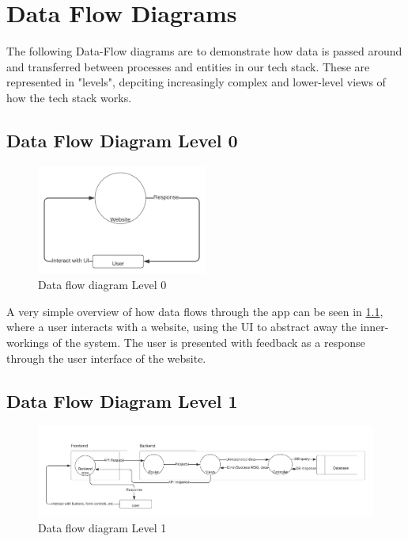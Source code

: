\documentclass[a4paper,11pt]{report}
\begin{document}
\chapter{Data Flow Diagrams}
The following Data-Flow diagrams are to demonstrate how data is passed around
and transferred between processes and entities in our tech stack. These are
represented in "levels", depciting increasingly complex and lower-level views of
how the tech stack works.

\section{Data Flow Diagram Level 0}
\begin{figure}[h]
    \centering
    \includegraphics[width=0.5\textwidth,keepaspectratio]{d2-dfd-0.png}
    \caption{Data flow diagram Level 0}
    \label{fig:dfd-0}
\end{figure}

A very simple overview of how data flows through the app can be seen in
\ref{fig:dfd-0}, where a user interacts with a website, using the UI to abstract
away the inner-workings of the system. The user is presented with feedback as a
response through the user interface of the website.

\newpage
\section{Data Flow Diagram Level 1}
\begin{figure}[h]
    \centering
    \includegraphics[width=\textwidth]{d2-dfd-1.png}
    \caption{Data flow diagram Level 1}
    \label{fig:dfd-1}
\end{figure}
\end{document}
